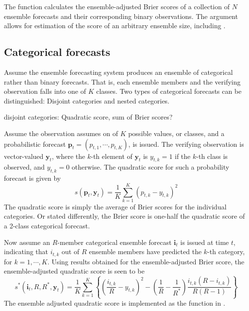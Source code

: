 \documentclass[article]{jss}
\begin{document}
The  function  calculates the ensemble-adjusted Brier scores of a collection of $N$ ensemble forecasts and their corresponding binary observations. 
The argument  allows for estimation of the score of an arbitrary ensemble size, including .


\subsection{Categorical forecasts}


Assume the ensemble forecasting system produces an ensemble of categorical rather than binary forecasts.
That is, each ensemble members and the verifying observation falls into one of $K$ classes.
Two types of categorical forecasts can be distinguished: Disjoint categories and nested categories.

disjoint categories: Quadratic score, sum of Brier scores?

Assume the observation assumes on of $K$ possible values, or classes, and a probabilistic forecast $\mathbf{p}_t = (p_{t,1}, \cdots, p_{t,K})$, is issued.
The verifying observation is vector-valued $\mathbf{y}_t$, where the $k$-th element of $\mathbf{y}_t$ is $y_{t,k}=1$ if the $k$-th class is observed, and $y_{t,k}=0$ otherwise.
The quadratic score for such a probability forecast is given by
%
\begin{equation}
s(\mathbf{p}_t, \mathbf{y}_t) = \frac{1}{K}\sum_{k=1}^K \left(p_{t,k} - y_{t,k}\right)^2
\end{equation}
%
The quadratic score is simply the average of Brier scores for the individual categories.
Or stated differently, the Brier score is one-half the quadratic score of a 2-class categorical forecast.

Now assume an $R$-member categorical ensemble forecast $\mathbf{i}_t$ is issued at time $t$, indicating that $i_{t,k}$ out of $R$ ensemble members have predicted the $k$-th category, for $k=1,\cdots,K$.
Using results obtained for the ensemble-adjusted Brier score, the ensemble-adjusted quadratic score is seen to be
%
\begin{equation}
s^*(\mathbf{i}_t, R, R^*, \mathbf{y}_t) = \frac{1}{K} \sum_{k=1}^K \left\{ \left(\frac{i_{t,k}}{R} - y_{t,k}\right)^2 - \left(\frac{1}{R} - \frac{1}{R^*}\right) \frac{i_{t,k}(R-i_{t,k})}{R(R-1)}\right\}
\end{equation}
%
The ensemble adjusted quadratic score is implemented as the function  in .
\end{document}
